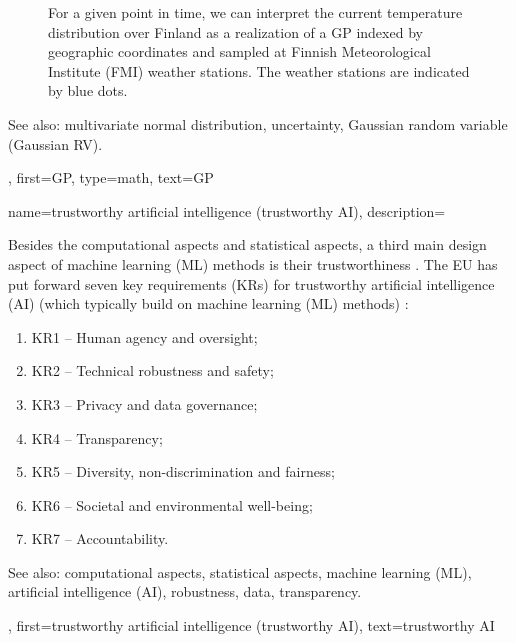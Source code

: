 {{{\begin{figure}[H]
\begin{center}
		\vspace*{-15mm}
	\end{center}
	\caption{For a given point in time, we can interpret the current temperature distribution 
	over Finland as a realization of a GP indexed by geographic coordinates and 
	sampled at Finnish Meteorological Institute (FMI) weather stations. The weather stations are indicated by blue dots. \label{fig_gp_FMI_dict}}
	\end{figure}
	See also: multivariate normal distribution, uncertainty, Gaussian random variable (Gaussian RV).}, 
  first={GP}, 
  type=math, 
  text={GP}
}

{name={trustworthy artificial intelligence (trustworthy AI)},
	description={Besides the computational aspects and statistical aspects, a third main design aspect of 
		machine learning (ML) methods is their trustworthiness \cite{pfau2024engineeringtrustworthyaideveloper}. 
		The EU has put forward seven key requirements (KRs) for trustworthy 
		artificial intelligence (AI) (which typically build on machine learning (ML) methods) \cite{ALTAIEU}: 
	\begin{enumerate}[label=\arabic*)]
		\item KR1 – Human agency and oversight;
		\item KR2 – Technical robustness and safety;
		\item KR3 – Privacy and data governance;
		\item KR4 – Transparency;
		\item KR5 – Diversity, non-discrimination and fairness; 
		\item KR6 – Societal and environmental well-being;
		\item KR7 – Accountability. 
	\end{enumerate}
		See also: computational aspects, statistical aspects, machine learning (ML), artificial intelligence (AI), robustness, data, transparency.},
	first={trustworthy artificial intelligence (trustworthy AI)},
	text={trustworthy AI}
}

}
